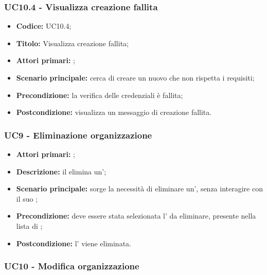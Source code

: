 \documentclass[casi-duso]{subfiles}
\begin{document}
\subsubsection{UC10.4 - Visualizza creazione fallita}
\label{subsub:UC10.4}
\begin{itemize}
  \item \textbf{Codice:} UC10.4;
  \item \textbf{Titolo:} Visualizza creazione fallita;
  \item \textbf{Attori primari:} ;
  \item \textbf{Scenario principale:}  cerca di creare un nuovo  che non rispetta i requisiti;
  \item \textbf{Precondizione:} la verifica delle credenziali è fallita;
  \item \textbf{Postcondizione:}  visualizza un messaggio di creazione fallita.
\end{itemize}



\subsubsection{UC9 - Eliminazione organizzazione}
\label{subsub:UC9}

\begin{itemize}
  \item \textbf{Attori primari:} ;
  \item \textbf{Descrizione:} il  elimina un';
  \item \textbf{Scenario principale:} sorge la necessità di eliminare un', senza interagire con il suo ;
  \item \textbf{Precondizione:} deve essere stata selezionata l' da eliminare, presente nella lista di ;
  \item \textbf{Postcondizione:} l' viene eliminata.

\end{itemize}


\subsubsection{UC10 - Modifica organizzazione}
\label{subsub:UC10}
\end{document}
